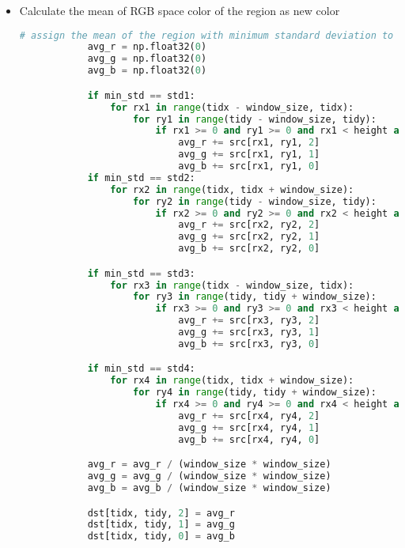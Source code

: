 \documentclass{article}
\begin{document}
\begin{itemize}
    \item Calculate the mean of RGB space color of the region as new color

    \begin{lstlisting}[language=Python]
            # assign the mean of the region with minimum standard deviation to the pixel
            avg_r = np.float32(0)
            avg_g = np.float32(0)
            avg_b = np.float32(0)

            if min_std == std1:
                for rx1 in range(tidx - window_size, tidx): 
                    for ry1 in range(tidy - window_size, tidy): 
                        if rx1 >= 0 and ry1 >= 0 and rx1 < height and ry1 < width:
                            avg_r += src[rx1, ry1, 2]
                            avg_g += src[rx1, ry1, 1]
                            avg_b += src[rx1, ry1, 0]
            if min_std == std2:
                for rx2 in range(tidx, tidx + window_size): 
                    for ry2 in range(tidy - window_size, tidy): 
                        if rx2 >= 0 and ry2 >= 0 and rx2 < height and ry2 < width:
                            avg_r += src[rx2, ry2, 2]
                            avg_g += src[rx2, ry2, 1]
                            avg_b += src[rx2, ry2, 0]

            if min_std == std3:
                for rx3 in range(tidx - window_size, tidx): 
                    for ry3 in range(tidy, tidy + window_size): 
                        if rx3 >= 0 and ry3 >= 0 and rx3 < height and ry3 < width:
                            avg_r += src[rx3, ry3, 2]
                            avg_g += src[rx3, ry3, 1]
                            avg_b += src[rx3, ry3, 0]

            if min_std == std4:
                for rx4 in range(tidx, tidx + window_size): 
                    for ry4 in range(tidy, tidy + window_size): 
                        if rx4 >= 0 and ry4 >= 0 and rx4 < height and ry4 < width:
                            avg_r += src[rx4, ry4, 2]
                            avg_g += src[rx4, ry4, 1]
                            avg_b += src[rx4, ry4, 0]

            avg_r = avg_r / (window_size * window_size)
            avg_g = avg_g / (window_size * window_size)
            avg_b = avg_b / (window_size * window_size)

            dst[tidx, tidy, 2] = avg_r
            dst[tidx, tidy, 1] = avg_g
            dst[tidx, tidy, 0] = avg_b
    \end{lstlisting}
    
\end{itemize}
\end{document}
